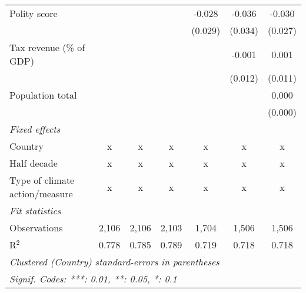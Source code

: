 \begin{tabular}{lcccccc}
   Polity score                                                                &         &               &                & -0.028        & -0.036        & -0.030\\   
                                                                               &         &               &                & (0.029)       & (0.034)       & (0.027)\\   
   Tax revenue (\% of GDP)                                                     &         &               &                &               & -0.001        & 0.001\\   
                                                                               &         &               &                &               & (0.012)       & (0.011)\\   
   Population total                                                            &         &               &                &               &               & 0.000\\   
                                                                               &         &               &                &               &               & (0.000)\\   
   \emph{Fixed effects}\\
   Country                                                                     & x       & x             & x              & x             & x             & x\\  
   Half decade                                                                 & x       & x             & x              & x             & x             & x\\  
   Type of climate action/measure                                              & x       & x             & x              & x             & x             & x\\  
   \midrule \emph{Fit statistics}\\
   Observations                                                                & 2,106   & 2,106         & 2,103          & 1,704         & 1,506         & 1,506\\  
   R$^2$                                                                       & 0.778   & 0.785         & 0.789          & 0.719         & 0.718         & 0.718\\  
   \midrule
   \multicolumn{7}{l}{\emph{Clustered (Country) standard-errors in parentheses}}\\
   \multicolumn{7}{l}{\emph{Signif. Codes: ***: 0.01, **: 0.05, *: 0.1}}\\
\end{tabular}
\par\endgroup


